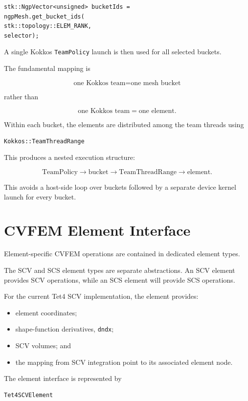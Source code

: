 \documentclass[11pt]{article}
\begin{document}
\begin{verbatim}
stk::NgpVector<unsigned> bucketIds =
ngpMesh.get_bucket_ids(
stk::topology::ELEM_RANK,
selector);
\end{verbatim}

A single Kokkos \texttt{TeamPolicy} launch is then used for all
selected buckets.

The fundamental mapping is

$$
\boxed{\text{one Kokkos team} = \text{one mesh bucket}}
$$

rather than

$$
\text{one Kokkos team} = \text{one element}.
$$

Within each bucket, the elements are distributed among the team
threads using

\begin{verbatim}
Kokkos::TeamThreadRange
\end{verbatim}

This produces a nested execution structure:

$$
\text{TeamPolicy}
\longrightarrow
\text{bucket}
\longrightarrow
\text{TeamThreadRange}
\longrightarrow
\text{element}.
$$

This avoids a host-side loop over buckets followed by a separate
device kernel launch for every bucket.

\section{CVFEM Element Interface}

Element-specific CVFEM operations are contained in dedicated
element types.

The SCV and SCS element types are separate abstractions.  An SCV
element provides SCV operations, while an SCS element will provide
SCS operations.

For the current Tet4 SCV implementation, the element provides:

\begin{itemize}
\item element coordinates;
\item shape-function derivatives, \texttt{dndx};
\item SCV volumes; and
\item the mapping from SCV integration point to its associated
element node.
\end{itemize}

The element interface is represented by

\begin{verbatim}
Tet4SCVElement
\end{verbatim}
\end{document}
